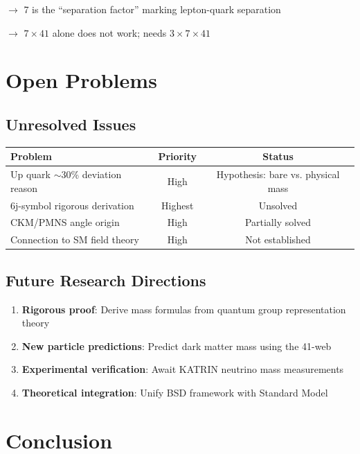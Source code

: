 ﻿\documentclass[11pt,a4paper]{article}
\begin{document}
$\rightarrow$ 7 is the ``separation factor'' marking lepton-quark separation

$\rightarrow$ $7 \times 41$ alone does not work; needs $3 \times 7 \times 41$

\section{Open Problems}

\subsection{Unresolved Issues}

\begin{table}[h]
\centering
\begin{tabular}{@{}lcc@{}}
\toprule
\textbf{Problem} & \textbf{Priority} & \textbf{Status} \\
\midrule
Up quark $\sim$30\% deviation reason & High & Hypothesis: bare vs. physical mass \\
6j-symbol rigorous derivation & Highest & Unsolved \\
CKM/PMNS angle origin & High & Partially solved \\
Connection to SM field theory & High & Not established \\
\bottomrule
\end{tabular}
\end{table}

\subsection{Future Research Directions}

\begin{enumerate}
    \item \textbf{Rigorous proof}: Derive mass formulas from quantum group representation theory
    \item \textbf{New particle predictions}: Predict dark matter mass using the 41-web
    \item \textbf{Experimental verification}: Await KATRIN neutrino mass measurements
    \item \textbf{Theoretical integration}: Unify BSD framework with Standard Model
\end{enumerate}

\section{Conclusion}
\end{document}

